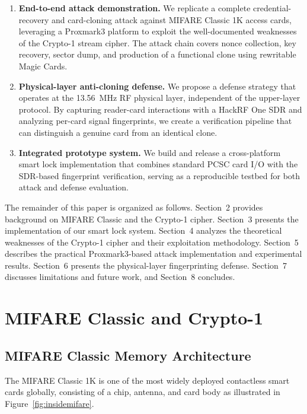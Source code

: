 \documentclass[sigconf]{acmart}
\begin{document}
\begin{enumerate}
\item \textbf{End-to-end attack demonstration.} We replicate a complete credential-recovery and card-cloning attack against MIFARE Classic 1K access cards, leveraging a Proxmark3 platform to exploit the well-documented weaknesses of the Crypto-1 stream cipher. The attack chain covers nonce collection, key recovery, sector dump, and production of a functional clone using rewritable Magic Cards.
\item \textbf{Physical-layer anti-cloning defense.} We propose a defense strategy that operates at the 13.56~MHz RF physical layer, independent of the upper-layer protocol. By capturing reader-card interactions with a HackRF One SDR and analyzing per-card signal fingerprints, we create a verification pipeline that can distinguish a genuine card from an identical clone.
\item \textbf{Integrated prototype system.} We build and release a cross-platform smart lock implementation that combines standard PCSC card I/O with the SDR-based fingerprint verification, serving as a reproducible testbed for both attack and defense evaluation.
\end{enumerate}

The remainder of this paper is organized as follows. Section~2 provides background on MIFARE Classic and the Crypto-1 cipher. Section~3 presents the implementation of our smart lock system. Section~4 analyzes the theoretical weaknesses of the Crypto-1 cipher and their exploitation methodology. Section~5 describes the practical Proxmark3-based attack implementation and experimental results. Section~6 presents the physical-layer fingerprinting defense. Section~7 discusses limitations and future work, and Section~8 concludes.

\section{MIFARE Classic and Crypto-1}
\label{sec:background}

\subsection{MIFARE Classic Memory Architecture}

The MIFARE Classic 1K is one of the most widely deployed contactless smart cards globally, consisting of a chip, antenna, and card body as illustrated in Figure~\ref{fig:insidemifare}.
\end{document}
